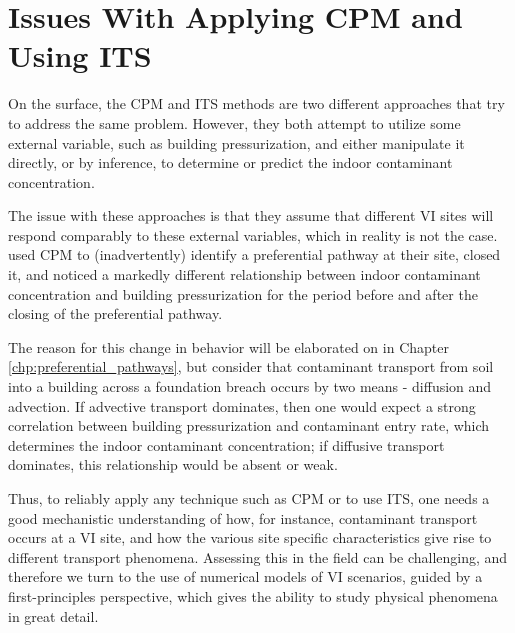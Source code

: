 \section{Issues With Applying CPM and Using ITS}

On the surface, the CPM and ITS methods are two different approaches that try to address the same problem.
However, they both attempt to utilize some external variable, such as building pressurization, and either manipulate it directly, or by inference, to determine or predict the indoor contaminant concentration.\par

The issue with these approaches is that they assume that different VI sites will respond comparably to these external variables, which in reality is not the case.
\citeauthor{guo_identification_2015}\cite{guo_identification_2015} used CPM to (inadvertently) identify a preferential pathway at their site, closed it, and noticed a markedly different relationship between indoor contaminant concentration and building pressurization for the period before and after the closing of the preferential pathway.\par

The reason for this change in behavior will be elaborated on in Chapter \ref{chp:preferential_pathways}, but consider that contaminant transport from soil into a building across a foundation breach occurs by two means - diffusion and advection.
If advective transport dominates, then one would expect a strong correlation between building pressurization and contaminant entry rate, which determines the indoor contaminant concentration; if diffusive transport dominates, this relationship would be absent or weak.\par

Thus, to reliably apply any technique such as CPM or to use ITS, one needs a good mechanistic understanding of how, for instance, contaminant transport occurs at a VI site, and how the various site specific characteristics give rise to different transport phenomena.
Assessing this in the field can be challenging, and therefore we turn to the use of numerical models of VI scenarios, guided by a first-principles perspective, which gives the ability to study physical phenomena in great detail.\par
